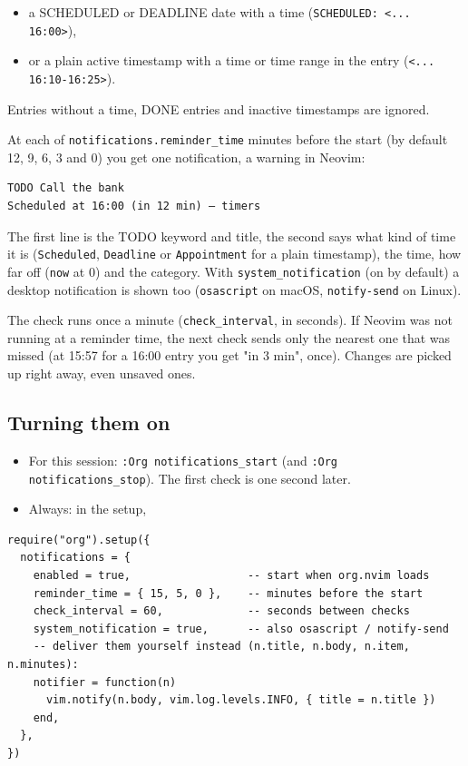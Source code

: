 \begin{itemize}
\item a SCHEDULED or DEADLINE date with a time
(\texttt{SCHEDULED: <... 16:00>}),
\item or a plain active timestamp with a time or time range in the entry
(\texttt{<... 16:10-16:25>}).
\end{itemize}

Entries without a time, DONE entries and inactive timestamps are ignored.

At each of \texttt{notifications.reminder\_time} minutes before the start (by
default 12, 9, 6, 3 and 0) you get one notification, a warning in Neovim:

\begin{verbatim}
TODO Call the bank
Scheduled at 16:00 (in 12 min) — timers
\end{verbatim}

The first line is the TODO keyword and title, the second says what kind
of time it is (\texttt{Scheduled}, \texttt{Deadline} or \texttt{Appointment} for a plain
timestamp), the time, how far off (\texttt{now} at 0) and the category. With
\texttt{system\_notification} (on by default) a desktop notification is shown too
(\texttt{osascript} on macOS, \texttt{notify-send} on Linux).

The check runs once a minute (\texttt{check\_interval}, in seconds). If Neovim
was not running at a reminder time, the next check sends only the
nearest one that was missed (at 15:57 for a 16:00 entry you get "in 3 min",
once). Changes are picked up right away, even unsaved ones.
\subsection{Turning them on}
\label{sec:org1fec826}
\begin{itemize}
\item For this session: \texttt{:Org notifications\_start} (and
\texttt{:Org notifications\_stop}). The first check is one second later.
\item Always: in the setup,
\end{itemize}

\begin{verbatim}
require("org").setup({
  notifications = {
    enabled = true,                  -- start when org.nvim loads
    reminder_time = { 15, 5, 0 },    -- minutes before the start
    check_interval = 60,             -- seconds between checks
    system_notification = true,      -- also osascript / notify-send
    -- deliver them yourself instead (n.title, n.body, n.item, n.minutes):
    notifier = function(n)
      vim.notify(n.body, vim.log.levels.INFO, { title = n.title })
    end,
  },
})
\end{verbatim}
